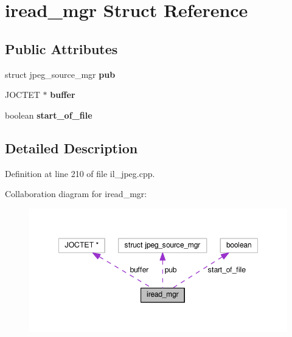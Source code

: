 \hypertarget{structiread__mgr}{}\section{iread\+\_\+mgr Struct Reference}
\label{structiread__mgr}
\subsection*{Public Attributes}
\begin{DoxyCompactItemize}
\item 
\mbox{\label{structiread__mgr_ab40b715e1eebb3be4b8ce90a16097dd3}} 
struct jpeg\+\_\+source\+\_\+mgr {\bfseries pub}
\item 
\mbox{\label{structiread__mgr_a1bee927b81d24d710ddc50a9b74d98f1}} 
J\+O\+C\+T\+ET $\ast$ {\bfseries buffer}
\item 
\mbox{\label{structiread__mgr_a05c2f4acdf40eeeba064f95548ffda81}} 
boolean {\bfseries start\+\_\+of\+\_\+file}
\end{DoxyCompactItemize}


\subsection{Detailed Description}


Definition at line 210 of file il\+\_\+jpeg.\+cpp.



Collaboration diagram for iread\+\_\+mgr\+:
\nopagebreak
\begin{figure}[H]
\begin{center}
\leavevmode
\includegraphics[width=348pt]{db/d90/structiread__mgr__coll__graph}
\end{center}
\end{figure}



